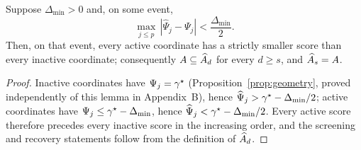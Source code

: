 \begin{lemma}\label{lem:app-separation}
Suppose $\Delta_{\min}>0$ and, on some event,
\[
 \max_{j\le p}\,|\widehat\Psi_j-\Psi_j|<\frac{\Delta_{\min}}{2}.
\]
Then, on that event, every active coordinate has a strictly smaller
score than every inactive coordinate; consequently
$A\subseteq\widehat{A}_d$ for every $d\ge s$, and
$\widehat{A}_s=A$.
\end{lemma}

\begin{proof}
Inactive coordinates have $\Psi_j=\gamma^\star$
(Proposition~\ref{prop:geometry}, proved independently of this lemma
in Appendix~B), hence
$\widehat\Psi_j>\gamma^\star-\Delta_{\min}/2$; active coordinates have
$\Psi_j\le\gamma^\star-\Delta_{\min}$, hence
$\widehat\Psi_j<\gamma^\star-\Delta_{\min}/2$.  Every active score therefore
precedes every inactive score in the increasing order, and the screening
and recovery statements follow from the definition of
$\widehat{A}_d$.
\end{proof}
